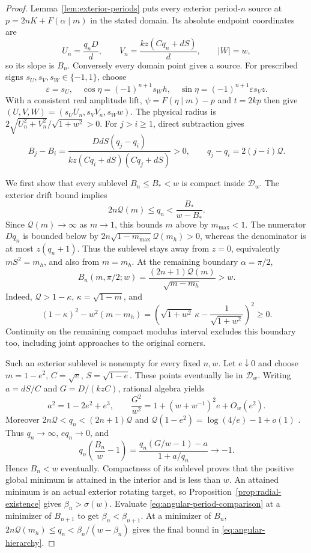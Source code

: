 \documentclass[11pt,a4paper]{article}
\theoremstyle{remark}\newtheorem{remark}[theorem]{Remark}
\begin{document}
\begin{proof}
Lemma~\ref{lem:exterior-periods} puts every exterior period-$n$ source
at $p=2nK+F(\alpha\mid m)$ in the stated domain. Its absolute endpoint
coordinates are
\[
 U_n=\frac{q_nD}{d},\qquad V_n=\frac{kz(Cq_n+dS)}d,
 \qquad |W|=w,
\]
so its slope is $B_n$. Conversely every domain point gives a source.
For prescribed signs $s_U,s_V,s_W\in\{-1,1\}$, choose
\[
 \varepsilon=s_U,\quad
 \cos\eta=(-1)^{n+1}s_Wh,\quad
 \sin\eta=(-1)^{n+1}\varepsilon s_Vz.
\]
With a consistent real amplitude lift, $\psi=F(\eta\mid m)-p$ and
$t=2kp$ then give $(U,V,W)=(s_UU_n,s_VV_n,s_Ww)$.
The physical radius is $2\sqrt{U_n^2+V_n^2}/\sqrt{1+w^2}>0$.
For $j>i\ge1$, direct subtraction gives
\begin{equation}\label{eq:angular-period-comparison}
 B_j-B_i=
 \frac{DdS(q_j-q_i)}{kz(Cq_i+dS)(Cq_j+dS)}>0,
 \qquad q_j-q_i=2(j-i)\mathcal Q.
\end{equation}

We first show that every sublevel $B_n\le B_*<w$ is compact inside
$\mathcal D_w$. The exterior drift bound implies
\[
 2n\mathcal Q(m)\le q_n<\frac{B_*}{w-B_*}.
\]
Since $\mathcal Q(m)\to\infty$ as $m\to1$, this bounds $m$ above by
$m_{\max}<1$. The numerator $Dq_n$ is bounded below by
$2n\sqrt{1-m_{\max}}\mathcal Q(m_h)>0$, whereas the denominator
is at most $z(q_n+1)$. Thus the sublevel stays away from $z=0$,
equivalently $mS^2=m_h$, and also from $m=m_h$.
At the remaining boundary $\alpha=\pi/2$,
\[
 B_n(m,\pi/2;w)=\frac{(2n+1)\mathcal Q(m)}{\sqrt{m-m_h}}>w.
\]
Indeed, $\mathcal Q>1-\kappa$, $\kappa=\sqrt{1-m}$, and
\[
 (1-\kappa)^2-w^2(m-m_h)
 =\left(\sqrt{1+w^2}\,\kappa-\frac1{\sqrt{1+w^2}}\right)^2\ge0.
\]
Continuity on the remaining compact modulus interval excludes this
boundary too, including joint approaches to the original corners.

Such an exterior sublevel is nonempty for every fixed $n,w$.
Let $e\downarrow0$ and choose $m=1-e^2$, $C=\sqrt e$,
$S=\sqrt{1-e}$. These points eventually lie in $\mathcal D_w$.
Writing $a=dS/C$ and $G=D/(kzC)$, rational algebra yields
\[
 a^2=1-2e^2+e^3,\qquad
 \frac{G^2}{w^2}=1+(w+w^{-1})^2e+O_w(e^2).
\]
Moreover $2n\mathcal Q<q_n<(2n+1)\mathcal Q$ and
$\mathcal Q(1-e^2)=\log(4/e)-1+o(1)$
\cite[Section 19.12]{DLMF}. Thus $q_n\to\infty$, $eq_n\to0$, and
\[
 q_n\left(\frac{B_n}w-1\right)
 =\frac{q_n(G/w-1)-a}{1+a/q_n}\longrightarrow-1.
\]
Hence $B_n<w$ eventually. Compactness of its sublevel proves that
the positive global minimum is attained in the interior and is less
than $w$. An attained minimum is an actual exterior rotating target,
so Proposition~\ref{prop:radial-existence} gives $\beta_n>\sigma(w)$.
Evaluate \eqref{eq:angular-period-comparison} at a minimizer of
$B_{n+1}$ to get $\beta_n<\beta_{n+1}$. At a minimizer of $B_n$,
$2n\mathcal Q(m_h)\le q_n<\beta_n/(w-\beta_n)$ gives
the final bound in \eqref{eq:angular-hierarchy}.


\end{proof}
\end{document}
